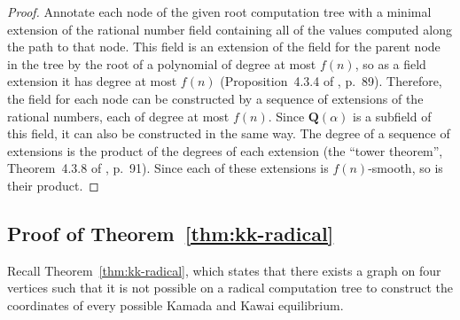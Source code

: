 \documentclass[oribibl,10pt]{llncs}
\newcommand{\rationals}{\mathbf{Q}}
\begin{document}
\begin{appendix}
\begin{proof}
Annotate each node of the given root computation tree with a minimal extension of the rational number field containing all of the values computed along the path to that node. This field is an extension of  the field for the parent node in the tree by the root of a polynomial of degree at most $f(n)$, so as a field extension it has degree at most $f(n)$ (Proposition~4.3.4 of \cite{Cox2012}, p.~89).
Therefore, the field for each node can be constructed by a sequence of extensions of the rational numbers, each of degree at most $f(n)$. Since $\rationals(\alpha)$ is a subfield of this field, it can also be constructed in the same way. The degree of a sequence of extensions is the product of the degrees of each extension (the ``tower theorem'', Theorem~4.3.8 of \cite{Cox2012}, p.~91). Since each of these extensions is $f(n)$-smooth, so is their product.
\end{proof}

\subsection{Proof of Theorem~\ref{thm:kk-radical}}
Recall Theorem~\ref{thm:kk-radical}, which states that
there exists a graph on four vertices such that it is not possible on a radical computation tree to construct the coordinates of every possible Kamada and Kawai equilibrium.


\end{appendix}
\end{document}
